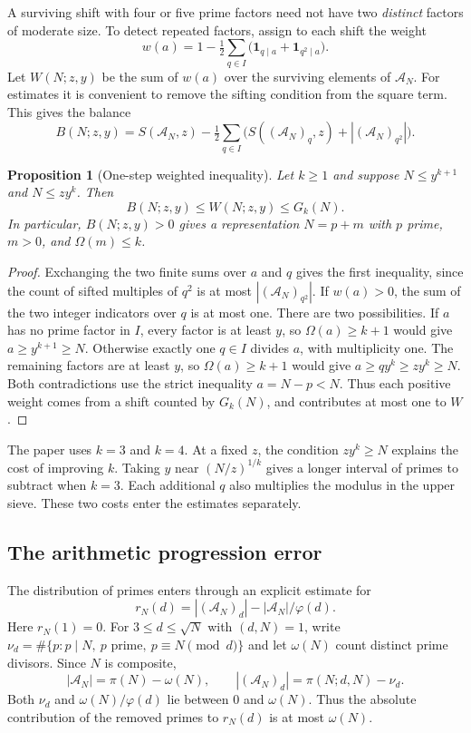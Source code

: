 \documentclass[11pt]{article}
\newtheorem{proposition}[theorem]{Proposition}
\theoremstyle{remark}\newtheorem{remark}[theorem]{Remark}
\begin{document}
A surviving shift with four or five prime factors need not have two
\emph{distinct} factors of moderate size. To detect repeated factors, assign
to each shift the weight
\[
 w(a)=1-\tfrac12\sum_{q\in I}
              \bigl(\mathbf 1_{q\mid a}+\mathbf 1_{q^2\mid a}\bigr).
\]
Let $W(N;z,y)$ be the sum of $w(a)$ over the surviving elements of $\mathcal A_N$.
For estimates it is convenient to remove the sifting condition from the
square term. This gives the balance
\begin{equation}\label{eq:switch}
 B(N;z,y)=S(\mathcal A_N,z)-\tfrac12\sum_{q\in I}
           \bigl(S((\mathcal A_N)_q,z)+|(\mathcal A_N)_{q^2}|\bigr).
\end{equation}

\begin{proposition}[One-step weighted inequality]\label{prop:pinch}
Let $k\ge1$ and suppose $N\le y^{k+1}$ and $N\le z y^k$. Then
\[
       B(N;z,y)\le W(N;z,y)\le G_k(N).
\]
In particular, $B(N;z,y)>0$ gives a representation $N=p+m$ with
$p$ prime, $m>0$, and $\Omega(m)\le k$.
\end{proposition}
\begin{proof}
Exchanging the two finite sums over $a$ and $q$ gives the first
inequality, since the count of sifted multiples of $q^2$ is at most
$|(\mathcal A_N)_{q^2}|$. If $w(a)>0$, the sum of the two integer indicators
over $q$ is at most one. There are two possibilities. If $a$ has no
prime factor in $I$, every factor is at least $y$, so $\Omega(a)\ge k+1$
would give $a\ge y^{k+1}\ge N$. Otherwise exactly one $q\in I$ divides
$a$, with multiplicity one. The remaining factors are at least $y$, so
$\Omega(a)\ge k+1$ would give $a\ge qy^k\ge zy^k\ge N$. Both
contradictions use the strict inequality $a=N-p<N$. Thus each positive
weight comes from a shift counted by $G_k(N)$, and contributes at most
one to $W$.
\end{proof}

The paper uses $k=3$ and $k=4$. At a fixed $z$, the condition
$zy^k\ge N$ explains the cost of improving $k$.
Taking $y$ near $(N/z)^{1/k}$ gives a longer interval of primes to
subtract when $k=3$. Each additional $q$ also multiplies the modulus
in the upper sieve. These two costs enter the estimates separately.

\subsection{The arithmetic progression error}

The distribution of primes enters through an explicit estimate for
\[
         r_N(d)=|(\mathcal A_N)_d|-|\mathcal A_N|/\varphi(d).
\]
Here $r_N(1)=0$. For $3\le d\le\sqrt N$ with $(d,N)=1$, write
$\nu_d=\#\{p:p\mid N,\ p\text{ prime},\ p\equiv N\pmod d\}$ and
let $\omega(N)$ count distinct prime divisors. Since $N$ is composite,
\[
 |\mathcal A_N|=\pi(N)-\omega(N),\qquad
 |(\mathcal A_N)_d|=\pi(N;d,N)-\nu_d.
\]
Both $\nu_d$ and $\omega(N)/\varphi(d)$ lie between $0$ and
$\omega(N)$. Thus the absolute contribution of the removed primes to
$r_N(d)$ is at most $\omega(N)$.
\end{document}
